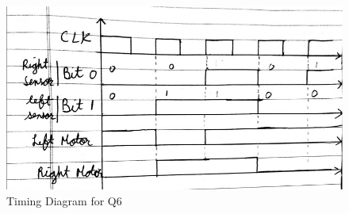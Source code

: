 \documentclass[11pt,a4paper]{article}
\begin{document}
	\begin{figure}[H]
		\centering
		\includegraphics[width=1\linewidth]{images/q6timing}
		\caption[]{Timing Diagram for Q6}
		\label{fig:q6timing}
	\end{figure}
\end{document}

